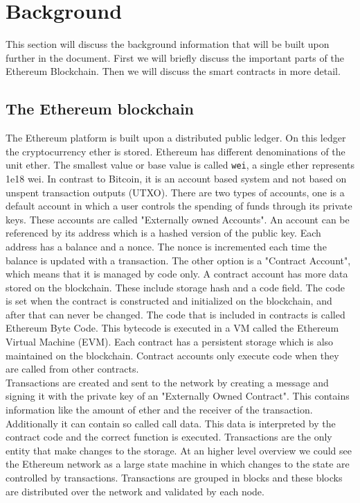 \documentclass[a4paper]{article}
\begin{document}
\section{Background}
This section will discuss the background information that will be built upon further in the document. First we will briefly discuss the important parts of the Ethereum Blockchain. Then we will discuss the smart contracts in more detail.
\subsection{The Ethereum blockchain}
The Ethereum platform is built upon a distributed public ledger. On this ledger the cryptocurrency ether is stored. Ethereum has different denominations of the unit ether. The smallest value or base value is called \texttt{wei}, a single ether represents 1e18 wei. In contrast to Bitcoin, it is an account based system and not based on unspent transaction outputs (UTXO). There are two types of accounts, one is a default account in which a user controls the spending of funds through its private keys. These accounts are called "Externally owned Accounts". An account can be referenced by its address which is a hashed version of the public key. Each address has a balance and a nonce. The nonce is incremented each time the balance is updated with a transaction. The other option is a "Contract Account", which means that it is managed by code only. A contract account has more data stored on the blockchain. These include storage hash and a code field. The code is set when the contract is constructed and initialized on the blockchain, and after that can never be changed. The code that is included in contracts is called Ethereum Byte Code. This bytecode is executed in a VM called the Ethereum Virtual Machine (EVM). Each contract has a persistent storage which is also maintained on the blockchain. Contract accounts only execute code when they are called from other contracts.\\
Transactions are created and sent to the network by creating a message and signing it with the private key of an "Externally Owned Contract". This contains information like the amount of ether and the receiver of the transaction. Additionally it can contain so called call data. This data is interpreted by the contract code and the correct function is executed. Transactions are the only entity that make changes to the storage. At an higher level overview we could see the Ethereum network as a large state machine in which changes to the state are controlled by transactions. Transactions are grouped in blocks and these blocks are distributed over the network and validated by each node. \\
\end{document}
